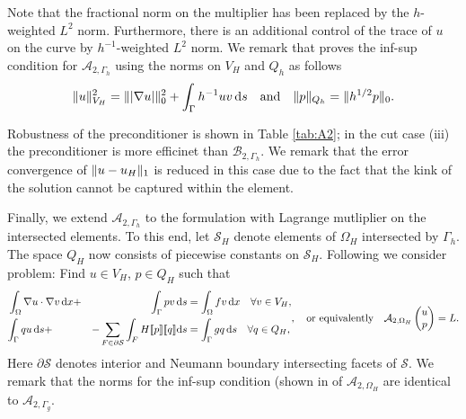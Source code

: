 Note that the fractional norm on the multiplier has been replaced by the $h$-weighted
$L^2$ norm. Furthermore, there is an additional control of the trace of $u$ on
the curve by $h^{-1}$-weighted $L^2$ norm. We remark that \cite{burman2014projection} proves
the inf-sup condition for $\mathcal{A}_{2, \Gamma_h}$ using the norms on $V_H$ and
$Q_h$ as follows
\[
\lVert{u}\rVert^2_{V_H} = \lVert{\lvert{\nabla u}\rvert}\rVert^2_0 + \int_{\Gamma}h^{-1} u v\,\mathrm{d}s
\quad\mbox{and}\quad
\lVert{p}\rVert_{Q_h} = \lVert{h^{1/2} p}\rVert_0.
\]

Robustness of the preconditioner is
shown in Table \ref{tab:A2}; in the cut case (iii) the preconditioner is more
efficinet than $\mathcal{B}_{2, \Gamma_h}$. We remark that the error convergence
of $\lVert{u-u_H}\rVert_1$ is reduced in this case due to the fact that the kink
of the solution cannot be captured within the element.

Finally, we extend $\mathcal{A}_{2, \Gamma_h}$ to the formulation with Lagrange
mutliplier on the intersected elements. To this end, let $\mathcal{S}_H$ denote
elements of $\Omega_H$ intersected by $\Gamma_h$. The space $Q_H$ now consists
of piecewise constants on $\mathcal{S}_H$. Following \cite[\S 4.B]{burman2014projection}
we consider problem: Find $u\in V_H$, $p\in  Q_H$ such that
%
\[
\begin{aligned}
  &\int_{\Omega}\nabla u\cdot\nabla v\,\mathrm{d}x + &{\int_{\Gamma}p v\,\mathrm{d}s} &= \int_{\Omega}f v\,\mathrm{d}x\quad\forall v\in V_H,\\
  &{\int_{\Gamma}q u\,\mathrm{d}s} + &-\sum_{F\in\partial\mathcal{S}}\int_{F}H[\![p]\!][\![q]\!] \mathrm{d}s &= \int_{\Gamma}g q\,\mathrm{d}s\quad\forall q\in Q_H,\\
\end{aligned},
\quad\mbox{or equivalently}\quad
\mathcal{A}_{2, \Omega_H}\begin{pmatrix}u\\p\\\end{pmatrix} = L.
\]
%
Here $\partial\mathcal{S}$ denotes interior and Neumann boundary intersecting
facets of $\mathcal{S}$. We remark that the norms for the inf-sup condition (shown
in \cite{burman2014projection} of $\mathcal{A}_{2, \Omega_H}$ are identical to $\mathcal{A}_{2, \Gamma_g}$.

